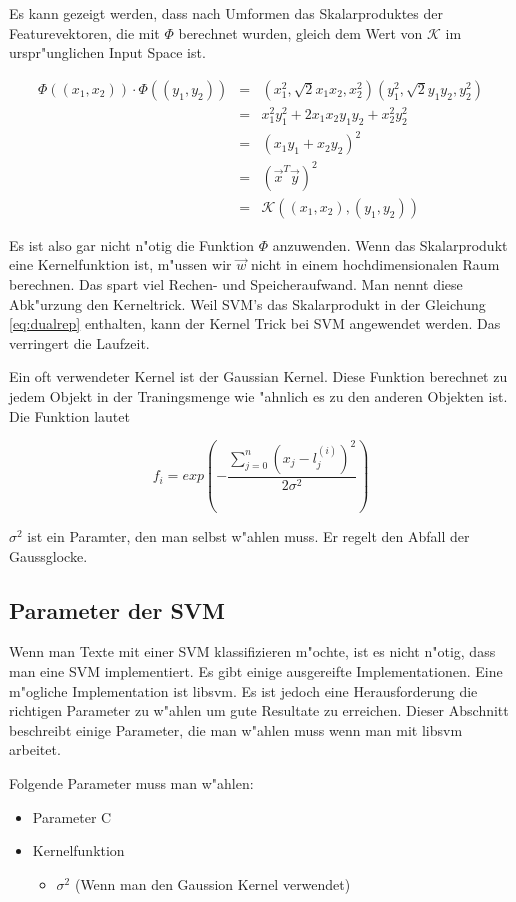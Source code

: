 \documentclass[12pt,a4paper,twoside]{article}
\begin{document}
Es kann gezeigt werden, dass nach Umformen das Skalarproduktes der Featurevektoren, die mit $\Phi$ berechnet wurden, gleich dem Wert von $\mathcal{K}$ im urspr"unglichen Input Space ist.

\begin{eqnarray}
  \label{eq:transformkernel}
  \Phi((x_1, x_2)) \cdot \Phi((y_1, y_2)) & = & (x_1^2, \sqrt{2} x_1 x_2, x_2^2)(y_1^2, \sqrt{2} y_1 y_2, y_2^2)\\
& = & x_1^2 y_1^2 + 2 x_1 x_2 y_1 y_2 + x_2^2 y_2^2 \\
& = & (x_1 y_1 + x_2 y_2)^2 \\
& = & (\vec{x}^T \vec{y})^2 \\
& = & \mathcal{K}((x_1,x_2),(y_1,y_2))
\end{eqnarray}

Es ist also gar nicht n"otig die Funktion $\Phi$ anzuwenden. Wenn das Skalarprodukt eine Kernelfunktion ist, m"ussen wir $\vec{w}$ nicht in einem hochdimensionalen Raum berechnen. Das spart viel Rechen- und Speicheraufwand. Man nennt diese Abk"urzung den Kerneltrick. Weil SVM's das Skalarprodukt in der Gleichung \ref{eq:dualrep} enthalten, kann der Kernel Trick bei SVM angewendet werden. Das verringert die Laufzeit.

Ein oft verwendeter Kernel ist der Gaussian Kernel. Diese Funktion berechnet zu jedem Objekt in der Traningsmenge wie "ahnlich es zu den anderen Objekten ist. Die Funktion lautet

\begin{equation}
  \label{eq:gauss}
  f_i = exp(-\frac{\sum_{j=0}^n(x_j - l_j^{(i)})^2}{2 \sigma^2})
\end{equation}

$\sigma^2$ ist ein Paramter, den man selbst w"ahlen muss. Er regelt den Abfall der Gaussglocke.

\subsection{Parameter der SVM}
\label{sec:parameters}

Wenn man Texte mit einer SVM klassifizieren m"ochte, ist es nicht n"otig, dass man eine SVM implementiert. Es gibt einige ausgereifte Implementationen. Eine m"ogliche Implementation ist libsvm. Es ist jedoch eine Herausforderung die richtigen Parameter zu w"ahlen um gute Resultate zu erreichen. Dieser Abschnitt beschreibt einige Parameter, die man w"ahlen muss wenn man mit libsvm arbeitet.

Folgende Parameter muss man w"ahlen:
\begin{itemize}
\item Parameter C
\item Kernelfunktion
  \begin{itemize}
  \item  $\sigma^2$ (Wenn man den Gaussion Kernel verwendet)
  \end{itemize}
\end{itemize}
\end{document}
